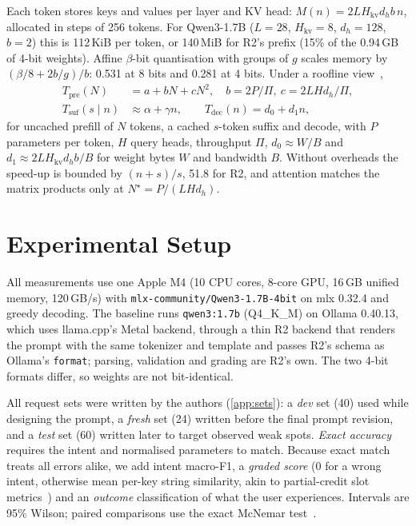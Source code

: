 \documentclass[journal]{IEEEtran}
\theoremstyle{definition}
\newcommand{\Hkv}{H_{\mathrm{kv}}}
\begin{document}
Each token stores keys and values per layer and KV head: $M(n)=2L\Hkv d_hb\,n$, allocated in steps
of 256 tokens. For Qwen3-1.7B ($L=28$, $\Hkv=8$, $d_h=128$, $b=2$) this is 112\,KiB per token, or
140\,MiB for R2's prefix (15\% of the 0.94\,GB of 4-bit weights). Affine $\beta$-bit quantisation
with groups of $g$ scales memory by $(\beta/8+2b/g)/b$: 0.531 at 8 bits and 0.281 at 4 bits. Under a
roofline view~\cite{williams2009roofline,pope2023efficiently},
\begin{align}
T_{\text{pre}}(N)&=a+bN+cN^2,\quad b=2P/\Pi,\ c=2LHd_h/\Pi,\label{eq:tpre}\\
T_{\text{suf}}(s\mid n)&\approx\alpha+\gamma n,\qquad T_{\text{dec}}(n)=d_0+d_1n,\label{eq:tsuf}
\end{align}
for uncached prefill of $N$ tokens, a cached $s$-token suffix and decode, with $P$ parameters per
token, $H$ query heads, throughput $\Pi$, $d_0\approx W/B$ and $d_1\approx2L\Hkv d_hb/B$ for
weight bytes $W$ and bandwidth $B$. Without overheads the speed-up is bounded by $(n+s)/s$, 51.8 for
R2, and attention matches the matrix products only at $N^\star=P/(LHd_h)$.

\section{Experimental Setup}\label{sec:setup}

All measurements use one Apple M4 (10 CPU cores, 8-core GPU, 16\,GB unified memory, 120\,GB/s) with
\texttt{mlx-community/Qwen3-1.7B-4bit} on mlx 0.32.4 and greedy decoding. The baseline runs
\texttt{qwen3:1.7b} (Q4\_K\_M) on Ollama 0.40.13, which uses llama.cpp's Metal backend, through a
thin R2 backend that renders the prompt with the same tokenizer and template and passes R2's schema
as Ollama's \texttt{format}; parsing, validation and grading are R2's own. The two 4-bit formats
differ, so weights are not bit-identical.

All request sets were written by the authors (\cref{app:sets}): a \emph{dev} set (40) used while
designing the prompt, a \emph{fresh} set (24) written before the final prompt revision, and a
\emph{test} set (60) written later to target observed weak spots. \emph{Exact accuracy} requires the
intent and normalised parameters to match. Because exact match treats all errors alike, we add
intent macro-F1, a \emph{graded score} (0 for a wrong intent, otherwise mean per-key string
similarity, akin to partial-credit slot metrics~\cite{bastianelli2020slurp}) and an \emph{outcome}
classification of what the user experiences. Intervals are 95\% Wilson; paired comparisons use the
exact McNemar test~\cite{mcnemar1947note}.
\end{document}
